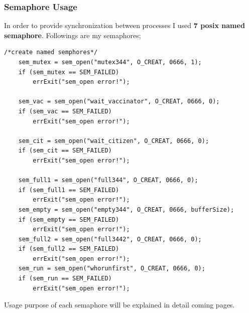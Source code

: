 \documentclass{article}
\begin{document}
\subsubsection{Semaphore Usage}
In order to provide synchronization between processes I used \textbf{7 posix named semaphore}.
Followings are my semaphores;
\begin{lstlisting}[style=CStyle]
    /*create named semphores*/
    sem_mutex = sem_open("mutex344", O_CREAT, 0666, 1);
    if (sem_mutex == SEM_FAILED)
        errExit("sem_open error!");

    sem_vac = sem_open("wait_vaccinator", O_CREAT, 0666, 0);
    if (sem_vac == SEM_FAILED)
        errExit("sem_open error!");

    sem_cit = sem_open("wait_citizen", O_CREAT, 0666, 0);
    if (sem_cit == SEM_FAILED)
        errExit("sem_open error!");

    sem_full1 = sem_open("full344", O_CREAT, 0666, 0);
    if (sem_full1 == SEM_FAILED)
        errExit("sem_open error!");
    sem_empty = sem_open("empty344", O_CREAT, 0666, bufferSize);
    if (sem_empty == SEM_FAILED)
        errExit("sem_open error!");
    sem_full2 = sem_open("full3442", O_CREAT, 0666, 0);
    if (sem_full2 == SEM_FAILED)
        errExit("sem_open error!");
    sem_run = sem_open("whorunfirst", O_CREAT, 0666, 0);
    if (sem_run == SEM_FAILED)
        errExit("sem_open error!");
\end{lstlisting}
Usage purpose of each semaphore will be explained in detail coming pages.
\end{document}
